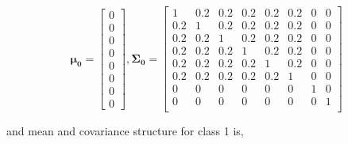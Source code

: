 \documentclass[AMA,STIX1COL,]{WileyNJD-v2}
\begin{document}
\begin{equation*}
\pmb{\mu_0} = \begin{bmatrix}
 0 \\ 0 \\ 0\\ 0 \\ 0 \\ 0 \\ 0 \\ 0
\end{bmatrix}, \pmb{\Sigma_0} = \begin{bmatrix}
1   & 0.2 & 0.2 & 0.2 & 0.2 & 0.2 & 0 & 0\\
0.2 & 1   & 0.2 & 0.2 & 0.2 & 0.2 & 0 & 0\\
0.2 & 0.2 & 1   & 0.2 & 0.2 & 0.2 & 0 & 0\\
0.2 & 0.2 & 0.2   & 1 & 0.2 & 0.2 & 0 & 0\\
0.2 & 0.2 & 0.2   & 0.2 & 1 & 0.2 & 0 & 0\\
0.2 & 0.2 & 0.2   & 0.2 & 0.2 & 1 & 0 & 0\\
0   & 0   & 0     &  0 & 0    & 0 & 1 & 0\\
0   & 0   & 0     &  0 & 0    & 0 & 0 & 1\\
\end{bmatrix}
\end{equation*}

\hfill\break
\hfill\break
and mean and covariance structure for class 1 is,\\
\end{document}
